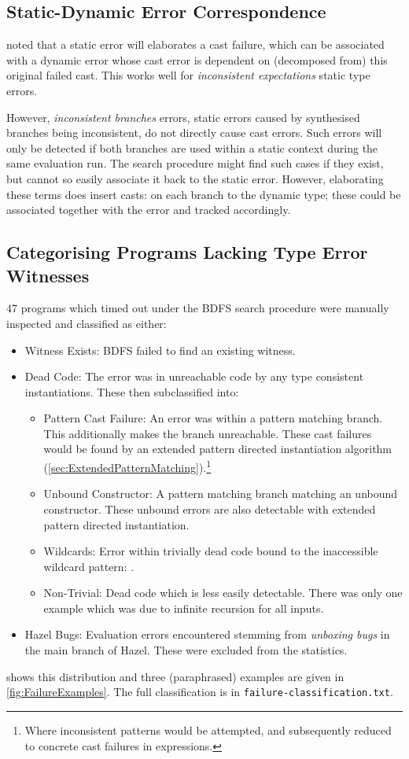 \subsection{Static-Dynamic Error Correspondence}
\label{sec:ErrorCorrespondence}
 noted that a static error will elaborates a cast failure, which can be associated with a dynamic error whose cast error is dependent on (decomposed from) this original failed cast. This works well for \textit{inconsistent expectations} static type errors.

However, \textit{inconsistent branches} errors, static errors caused by synthesised branches being inconsistent, do not directly cause cast errors. Such errors will only be detected if both branches are used within a static context during the same evaluation run. The search procedure might find such cases if they exist, but cannot so easily associate it back to the static error. However, elaborating these terms does insert casts: on each branch to the dynamic type; these could be associated together with the error and tracked accordingly. 
  
\subsection{Categorising Programs Lacking Type Error Witnesses}
47 programs which timed out under the BDFS search procedure were manually inspected and classified as either:
\begin{itemize}
\item Witness Exists: BDFS failed to find an existing witness.
\item Dead Code: The error was in unreachable code by any type consistent instantiations. These then subclassified into:
\begin{itemize}
\item Pattern Cast Failure: An error was within a pattern matching branch. This additionally makes the branch unreachable. These cast failures would be found by an extended pattern directed instantiation algorithm (\cref{sec:ExtendedPatternMatching}).\footnote{Where inconsistent patterns would be attempted, and subsequently reduced to concrete cast failures in expressions.}
\item Unbound Constructor: A pattern matching branch matching an unbound constructor. These unbound errors are also detectable with extended pattern directed instantiation.
\item Wildcards: Error within trivially dead code bound to the inaccessible wildcard pattern: .
\item Non-Trivial: Dead code which is less easily detectable. There was only one example which was due to infinite recursion for all inputs.
\end{itemize}
\item Hazel Bugs: Evaluation errors encountered stemming from \textit{unboxing bugs} in the main branch of Hazel. These were excluded from the statistics.
\end{itemize}
 shows this distribution and three (paraphrased) examples are given in \cref{fig:FailureExamples}. The full classification is in \texttt{failure-classification.txt}.

